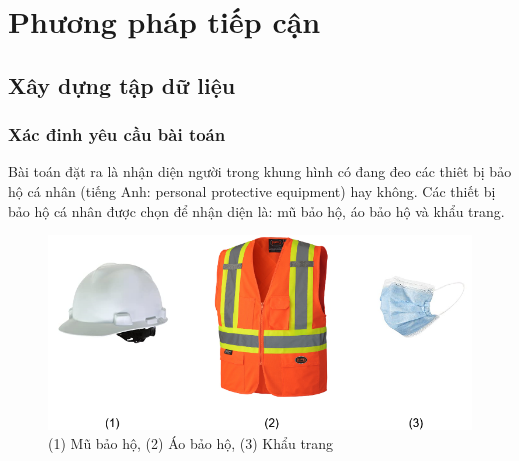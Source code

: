 \chapter{Phương pháp tiếp cận}

\section{Xây dựng tập dữ liệu}
\subsection{Xác đinh yêu cầu bài toán}
Bài toán đặt ra là nhận diện người trong khung hình có đang đeo các thiêt bị bảo hộ cá nhân (tiếng Anh: personal protective equipment) hay không. Các thiết bị bảo hộ cá nhân được chọn để nhận diện là: mũ bảo hộ, áo bảo hộ và khẩu trang.
\begin{figure}[ht!]
	\centerline{\includegraphics[scale=0.3]{images/ppe.png}}
  	\caption{(1) Mũ bảo hộ, (2) Áo bảo hộ, (3) Khẩu trang}
  	\label{fig:ppe}
\end{figure}

